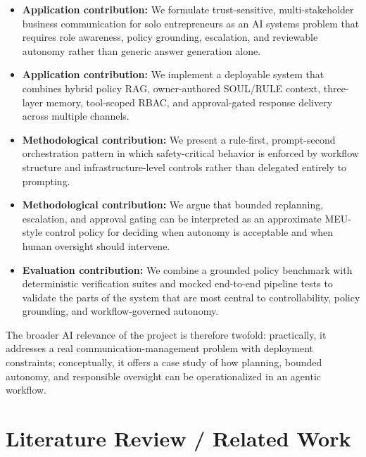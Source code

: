 \documentclass[11pt]{article}
\begin{document}
\begin{itemize}
\item \textbf{Application contribution:} We formulate trust-sensitive, multi-stakeholder business communication for solo entrepreneurs as an AI systems problem that requires role awareness, policy grounding, escalation, and reviewable autonomy rather than generic answer generation alone.
\item \textbf{Application contribution:} We implement a deployable system that combines hybrid policy RAG, owner-authored SOUL/RULE context, three-layer memory, tool-scoped RBAC, and approval-gated response delivery across multiple channels.
\item \textbf{Methodological contribution:} We present a rule-first, prompt-second orchestration pattern in which safety-critical behavior is enforced by workflow structure and infrastructure-level controls rather than delegated entirely to prompting.
\item \textbf{Methodological contribution:} We argue that bounded replanning, escalation, and approval gating can be interpreted as an approximate MEU-style control policy for deciding when autonomy is acceptable and when human oversight should intervene.
\item \textbf{Evaluation contribution:} We combine a grounded policy benchmark with deterministic verification suites and mocked end-to-end pipeline tests to validate the parts of the system that are most central to controllability, policy grounding, and workflow-governed autonomy.
\end{itemize}

The broader AI relevance of the project is therefore twofold: practically, it addresses a real communication-management problem with deployment constraints; conceptually, it offers a case study of how planning, bounded autonomy, and responsible oversight can be operationalized in an agentic workflow.

\section{Literature Review / Related Work}
\end{document}
